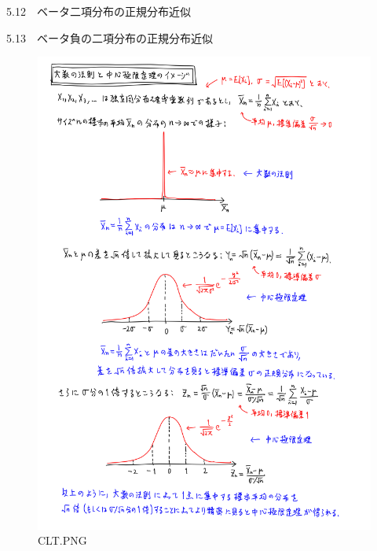 \documentclass[10pt, a4paper,xelatex,ja=standard]{bxjsarticle}
\begin{document}
{{5.12~~}ベータ二項分布の正規分布近似}

{{5.13~~}ベータ負の二項分布の正規分布近似}

    \begin{figure}
\centering
\includegraphics{CLT.PNG}
\caption{CLT.PNG}
\end{figure}
\end{document}
